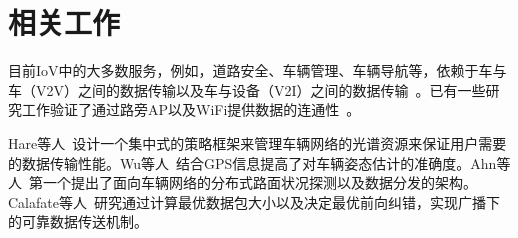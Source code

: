 %

\section{相关工作}

目前IoV中的大多数服务，例如，道路安全、车辆管理、车辆导航等，依赖于车与车（V2V）之间的数据传输以及车与设备（V2I）之间的数据传输~\cite{du2015information}。已有一些研究工作验证了通过路旁AP以及WiFi提供数据的连通性~\cite{ott2005disconnection, balasubramanian2008interactive}。



Hare等人~\cite{hare2012policy}设计一个集中式的策略框架来管理车辆网络的光谱资源来保证用户需要的数据传输性能。Wu等人~\cite{wu2013improving}结合GPS信息提高了对车辆姿态估计的准确度。Ahn等人~\cite{ahn2012risa}第一个提出了面向车辆网络的分布式路面状况探测以及数据分发的架构。Calafate等人~\cite{calafate2012efficient}研究通过计算最优数据包大小以及决定最优前向纠错，实现广播下的可靠数据传送机制。


